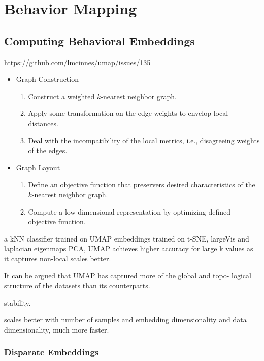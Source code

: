 \chapter{Behavior Mapping}

\section{Computing Behavioral Embeddings}
\citet{belkin_laplacian_2003}
\citet{maaten_visualizing_2008}
\citet{tang_visualizing_2016}
\citet{mcinnes_umap_2020}

https://github.com/lmcinnes/umap/issues/135

\begin{itemize}
	\item Graph Construction
	      \begin{enumerate}
		      \item Construct a weighted $k$-nearest neighbor graph.
		      \item Apply some transformation on the edge weights to envelop local distances.
		      \item Deal with the incompatibility of the local metrics, i.e., disagreeing weights of the edges.
	      \end{enumerate}
	\item Graph Layout
	      \begin{enumerate}
		      \item Define an objective function that preservers desired characteristics of the $k$-nearest neighbor graph.
		      \item Compute a low dimensional representation by optimizing defined objective function.
	      \end{enumerate}
\end{itemize}

a kNN classifier trained on UMAP embeddings trained on t-SNE, largeVis and laplacian eigenmaps PCA, UMAP achieves higher accuracy for large k values as it captures non-local scales better.

It can be argued that UMAP has captured more of the global and topo-
logical structure of the datasets than its counterparts.

stability.

scales better with number of samples and embedding dimensionality and data dimensionality, much more faster.

\subsection{Disparate Embeddings}

